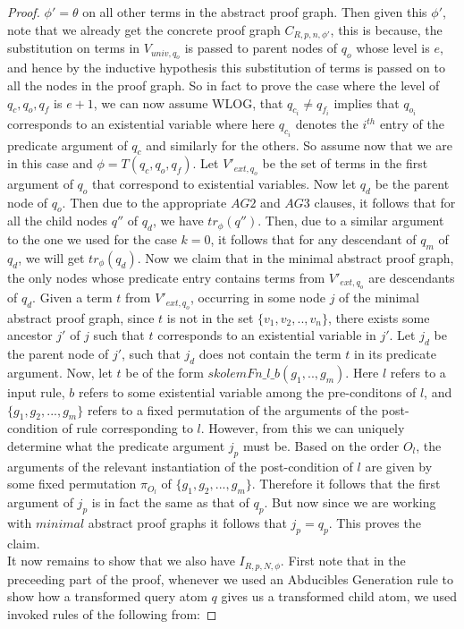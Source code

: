 \begin{proof}
$\phi' =\theta$ on all other terms in the abstract proof graph. Then given
this $\phi'$, note that we already get the concrete proof graph
$C_{R,p,n,\phi'}$, this is because, the substitution on terms in $V_{univ,q_{o}}$ is passed to parent nodes of $q_{o}$ whose level is $e$, and hence by the inductive hypothesis this substitution of terms is passed on to all the nodes in the proof graph. So in fact to
prove the case where the level of $q_{c},q_{o},q_{f}$ is $e+1$, we can now
assume WLOG, that $q_{c_i}\neq q_{f_i}$ implies that $q_{o_i}$
corresponds to an existential variable where here $q_{c_i}$ denotes the
$i^{th}$ entry of the predicate argument of $q_{c}$ and similarly for the
others. So assume now that we are in this case and
$\phi= T(q_{c},q_{o},q_{f})$. Let $V'_{ext,q_{o}}$ be the set of terms in the
first argument of $q_{o}$ that correspond to existential variables. Now let
$q_{d}$ be the parent node of $q_{o}$. Then due to the appropriate $AG2$ and
$AG3$ clauses, it follows that for all the child nodes $q''$ of $q_{d}$, we
have $tr_{\phi}(q'')$. Then, due to a similar argument to the one we used for the
case $k=0$, it follows that for any descendant of $q_{m}$ of $q_{d}$, we will
get $tr_{\phi}(q_{d})$. Now we claim that in the minimal abstract proof graph, the
only nodes whose predicate entry contains terms from $V'_{ext,q_{o}}$ are
descendants of $q_{d}$. Given a term $t$ from $V'_{ext,q_{o}}$, occurring in some
node $j$ of the minimal abstract proof graph, since $t$ is not in the set
$\{v_{1},v_{2},..,v_{n}\}$, there exists some ancestor $j'$ of $j$ such that
$t$ corresponds to an existential variable in $j'$. Let $j_{d}$ be the parent
node of $j'$, such that $j_{d}$ does not contain the term $t$ in its predicate argument. Now, let $t$ be of the form
$skolemFn\_l\_b(g_{1},..,g_{m})$. Here $l$ refers to a input rule, $b$ refers
to some existential variable among the pre-conditons of $l$, and
$\{g_{1},g_{2},...,g_{m}\}$ refers to a fixed permutation of the arguments of
the post-condition of rule corresponding to $l$. However, from this we can
uniquely determine what the predicate argument $j_{p}$ must be. Based on the order
$O_{l}$, the arguments of the relevant instantiation of the post-condition of
$l$ are given by some fixed permutation $\pi_{O_{l}}$ of
$\{g_{1},g_{2},...,g_{m}\}$. Therefore it follows that the first argument of
$j_{p}$ is in fact the same as that of $q_{p}$. But now since we are working
with $\textit{minimal}$ abstract proof graphs it follows that
$j_{p} = q_{p}$. This proves the claim. \\It now remains to show that we also have $I_{R,p,N,\phi}$. First note that in the preceeding part of the proof, whenever we used an Abducibles Generation rule to show how a transformed query atom $q$ gives us a transformed child atom, we used invoked rules of the following from:

\end{proof}
